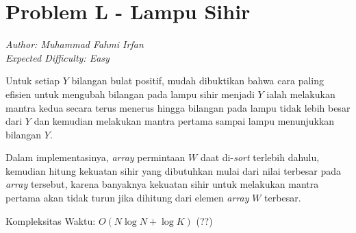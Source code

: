 \section*{Problem L - Lampu Sihir}
\textit{Author: Muhammad Fahmi Irfan}
\\
\textit{Expected Difficulty: Easy}

Untuk setiap $Y$ bilangan bulat positif, mudah dibuktikan bahwa cara paling efisien untuk mengubah bilangan pada lampu sihir menjadi $Y$ ialah melakukan mantra kedua secara terus menerus hingga bilangan pada lampu tidak lebih besar dari $Y$ dan kemudian melakukan mantra pertama sampai lampu menunjukkan bilangan $Y$.

Dalam implementasinya, \textit{array} permintaan $W$ daat di-\textit{sort} terlebih dahulu, kemudian hitung kekuatan sihir yang dibutuhkan mulai dari nilai terbesar pada \textit{array} tersebut, karena banyaknya kekuatan sihir untuk melakukan mantra pertama akan tidak turun jika dihitung dari elemen \textit{array} $W$ terbesar.

Kompleksitas Waktu: $O(N\log N + \log K)$ (??)
